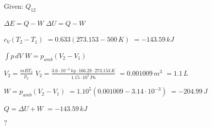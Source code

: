 Given: \( Q_{12} \)  

\( \Delta E = Q - W \)  
\( \Delta U = Q - W \)  

\( c_V (T_2 - T_1) \)  
\( = 0.633 (273.153 - 500 \, K) \)  
\( = -143.59 \, kJ \)  

\( \int p \, dV \)  
\( W = p_{amb} (V_2 - V_1) \)  

\( V_2 = \frac{\dot{m} R T_2}{p_2} \)  
\( V_2 = \frac{3.6 \cdot 10^{-3} \, kg \cdot 166.28 \cdot 273.153 \, K}{1.15 \cdot 10^5 \, Pa} \)  
\( = 0.001009 \, m^3 \)  
\( = 1.1 \, L \)  

\( W = p_{amb} (V_2 - V_1) \)  
\( = 1.10^5 (0.001009 - 3.14 \cdot 10^{-3}) \)  
\( = -204.99 \, J \)  

\( Q = \Delta U + W \)  
\( = -143.59 \, kJ \)  

\( ? \)